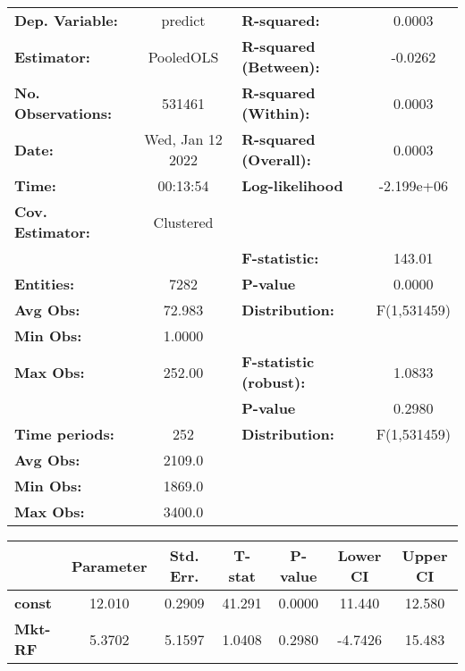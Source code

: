 \begin{center}
\begin{tabular}{lclc}
\toprule
\textbf{Dep. Variable:}    &      predict       & \textbf{  R-squared:         }   &      0.0003      \\
\textbf{Estimator:}        &     PooledOLS      & \textbf{  R-squared (Between):}  &     -0.0262      \\
\textbf{No. Observations:} &       531461       & \textbf{  R-squared (Within):}   &      0.0003      \\
\textbf{Date:}             &  Wed, Jan 12 2022  & \textbf{  R-squared (Overall):}  &      0.0003      \\
\textbf{Time:}             &      00:13:54      & \textbf{  Log-likelihood     }   &    -2.199e+06    \\
\textbf{Cov. Estimator:}   &     Clustered      & \textbf{                     }   &                  \\
\textbf{}                  &                    & \textbf{  F-statistic:       }   &      143.01      \\
\textbf{Entities:}         &        7282        & \textbf{  P-value            }   &      0.0000      \\
\textbf{Avg Obs:}          &       72.983       & \textbf{  Distribution:      }   &   F(1,531459)    \\
\textbf{Min Obs:}          &       1.0000       & \textbf{                     }   &                  \\
\textbf{Max Obs:}          &       252.00       & \textbf{  F-statistic (robust):} &      1.0833      \\
\textbf{}                  &                    & \textbf{  P-value            }   &      0.2980      \\
\textbf{Time periods:}     &        252         & \textbf{  Distribution:      }   &   F(1,531459)    \\
\textbf{Avg Obs:}          &       2109.0       & \textbf{                     }   &                  \\
\textbf{Min Obs:}          &       1869.0       & \textbf{                     }   &                  \\
\textbf{Max Obs:}          &       3400.0       & \textbf{                     }   &                  \\
\bottomrule
\end{tabular}
\begin{tabular}{lcccccc}
                & \textbf{Parameter} & \textbf{Std. Err.} & \textbf{T-stat} & \textbf{P-value} & \textbf{Lower CI} & \textbf{Upper CI}  \\
\midrule
\textbf{const}  &       12.010       &       0.2909       &      41.291     &      0.0000      &       11.440      &       12.580       \\
\textbf{Mkt-RF} &       5.3702       &       5.1597       &      1.0408     &      0.2980      &      -4.7426      &       15.483       \\
\bottomrule
\end{tabular}
\end{center}
